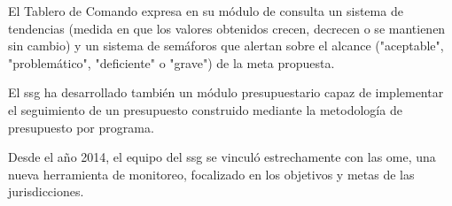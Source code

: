 El Tablero de Comando expresa en su módulo de consulta un sistema de tendencias (medida en que los valores obtenidos crecen, decrecen o se mantienen sin cambio) y un sistema de semáforos que alertan sobre el alcance ("aceptable", "problemático", "deficiente" o "grave") de la meta propuesta.

El \ac{ssg} ha desarrollado también un módulo presupuestario capaz de implementar el seguimiento de un presupuesto construido mediante la metodología de presupuesto por programa.

Desde el año 2014, el equipo del \ac{ssg} se vinculó estrechamente con las \ac{ome}, una nueva herramienta de monitoreo, focalizado en los objetivos y metas de las jurisdicciones.






